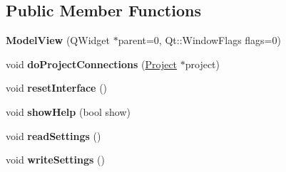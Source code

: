 \subsection*{Public Member Functions}
\begin{DoxyCompactItemize}
\item 
\hypertarget{class_model_view_a3f26b75ef72d9a02cd405cb1683e9498}{{\bfseries Model\-View} (Q\-Widget $\ast$parent=0, Qt\-::\-Window\-Flags flags=0)}\label{class_model_view_a3f26b75ef72d9a02cd405cb1683e9498}

\item 
\hypertarget{class_model_view_a4427db9cef1a0f244ff2942a4a9389ec}{void {\bfseries do\-Project\-Connections} (\hyperlink{class_project}{Project} $\ast$project)}\label{class_model_view_a4427db9cef1a0f244ff2942a4a9389ec}

\item 
\hypertarget{class_model_view_a941fe309f37d3244c5bd8ee921623e96}{void {\bfseries reset\-Interface} ()}\label{class_model_view_a941fe309f37d3244c5bd8ee921623e96}

\item 
\hypertarget{class_model_view_a8d3248f2b9f2db58cdb69f84e581f776}{void {\bfseries show\-Help} (bool show)}\label{class_model_view_a8d3248f2b9f2db58cdb69f84e581f776}

\item 
\hypertarget{class_model_view_a1189ab236ce1ec8469049e1d0cce6670}{void {\bfseries read\-Settings} ()}\label{class_model_view_a1189ab236ce1ec8469049e1d0cce6670}

\item 
\hypertarget{class_model_view_a559a7a135e735b0b3fd1a2b69328b74b}{void {\bfseries write\-Settings} ()}\label{class_model_view_a559a7a135e735b0b3fd1a2b69328b74b}

\end{DoxyCompactItemize}

